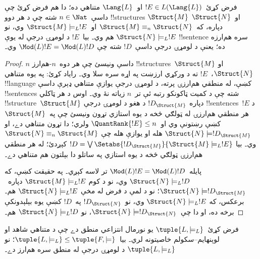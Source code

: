 \documentclass[../../../include/open-logic-section]{subfiles}
\begin{document}


\begin{lem}
فرض کړئ~$!E \in L(\Lang{L})$ او~$\Lang{L}$ متناهي ده؛ دا هم فرض
کړئ چې داسې~$n \in \Nat$ شته چې د هر دوو !!{structure}s
$\Struct{M}$ او~$\Struct{N}$ دپاره، که~$\Struct{M} \equiv_n
\Struct{N}$ او~$\Struct{M} \models_L !E$ وي، نو
$\Struct{N} \models_L !E$ هم وي۔ بيا~$!E$ د لومړۍ درجې له يوې
!!{sentence} سره هم‌ارزه ده؛ يعنې د لومړۍ درجې داسې~$!D$ شته چې
$\Mod(L){!E} = \Mod(L){!D}$ وي۔
\end{lem}

\begin{proof}
$n$ داسې ونيسئ چې هر دوه~$n$-هم‌ارز !!{structure}s~$\Struct{M}$ او
$\Struct{N}$،~$!E$ ته د ورکړي ارزښت په اړه سره سلا وي۔
 راياد کړئ: په يوه متناهي
!!{language} کښې، له منطقي هم‌ارزۍ پرته، د لومړۍ درجې يوازې متناهي
ډېرې داسې !!{sentence}s شته چې د کميت ټاکونکو رتبه ئې تر~$n$ زياته
نۀ وي۔ اوس د هر ټاکلي !!{structure}~$\Struct{M}$ دپاره
$!D_{\Struct{M}}$ د هغو د لومړۍ درجې !!{sentence}s~$!E$ د هر منطقي
هم‌ارزۍ له ټولګي څخه د يوه استازي تړون ونيسئ چې په~$\Struct{M}$ کښې
رښتونې وي او~$\QuantRank{!E} \le n$ ولري؛ دا تړون متناهي دے، او
$\Struct{N} \models !D_{\Struct{M}}$ هله او يوازې هله چې
$\Struct{N} \equiv_n \Struct{M}$ وي۔ بيا
$!D = \textstyle\bigvee
\Setabs{!D_{\Struct{M}}}{\Struct{M} \models_L !E}$ کېږدئ؛ له هر
منطقي هم‌ارزۍ ټولګي څخه د يوه استازي په ساتلو دا بېلتون هم متناهي
دے۔

پايله~$\Mod(L){!E} = \Mod(L){!D}$ تر لاسه کېږي۔ په حقيقت کښې، که
$\Struct{N} \models_L !D$ وي، نو د کوم
$\Struct{M} \models_L !E$ دپاره~$\Struct{N} \models
!D_{\Struct{M}}$؛ نو د لمې د فرض له مخې
$\Struct{N} \models_L !E$ هم۔ برعکس، که
$\Struct{N} \models_L !E$ وي، نو~$!D_\Struct{N}$ په~$!D$ کښې يوه
بېلېدونکې برخه ده، او دا چې~$\Struct{N} \models !D_\Struct{N}$، نو
$\Struct{N} \models_L !D$ هم۔
\end{proof}

\begin{thm}
   فرض کړئ~$\tuple{L, \models_L}$ يو نورمال
  انتزاعي منطق دے چې د متناهي شاهد او لوېنهايم--سکولم خاصيتونه لري۔
  بيا~$\tuple{L, \models_L} \le \tuple{F, \models}$؛ نو
  $\tuple{L, \models_L}$ د لومړۍ درجې له منطق سره هم‌ارز دے۔
\end{thm}
\end{document}
